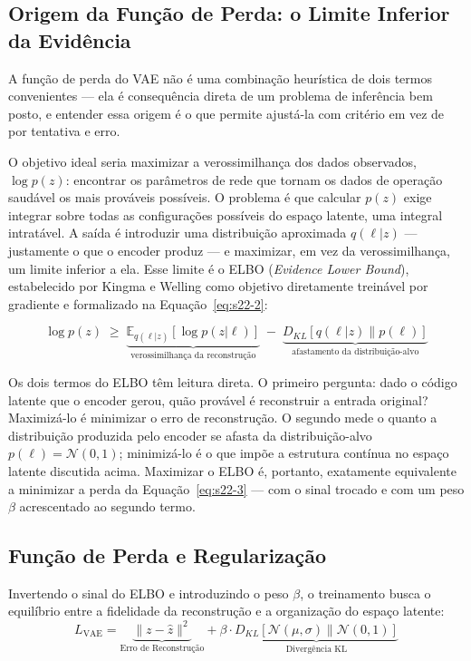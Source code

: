 \documentclass[12pt,a4paper]{article}
\numberwithin{equation}{section}
\numberwithin{table}{section}
\numberwithin{figure}{section}
\begin{document}
{	\subsection{Origem da Função de Perda: o Limite Inferior da Evidência}

	A função de perda do VAE não é uma combinação heurística de dois termos convenientes — ela é consequência direta de um problema de inferência bem posto, e entender essa origem é o que permite ajustá-la com critério em vez de por tentativa e erro.

	O objetivo ideal seria maximizar a verossimilhança dos dados observados, $\log p(z)$: encontrar os parâmetros de rede que tornam os dados de operação saudável os mais prováveis possíveis. O problema é que calcular $p(z)$ exige integrar sobre todas as configurações possíveis do espaço latente, uma integral intratável. A saída é introduzir uma distribuição aproximada $q(\ell|z)$ — justamente o que o encoder produz — e maximizar, em vez da verossimilhança, um limite inferior a ela. Esse limite é o ELBO (\textit{Evidence Lower Bound}), estabelecido por Kingma e Welling como objetivo diretamente treinável por gradiente \cite{vae} e formalizado na Equação~\eqref{eq:s22-2}:

	\begin{equation}\label{eq:s22-2}
	\log p(z) \;\ge\; \underbrace{\mathbb{E}_{q(\ell|z)}\left[ \log p(z|\ell) \right]}_{\text{verossimilhança da reconstrução}} \;-\; \underbrace{D_{KL}\left[ q(\ell|z) \parallel p(\ell) \right]}_{\text{afastamento da distribuição-alvo}}
\end{equation}

	Os dois termos do ELBO têm leitura direta. O primeiro pergunta: dado o código latente que o encoder gerou, quão provável é reconstruir a entrada original? Maximizá-lo é minimizar o erro de reconstrução. O segundo mede o quanto a distribuição produzida pelo encoder se afasta da distribuição-alvo $p(\ell) = \mathcal{N}(0,1)$; minimizá-lo é o que impõe a estrutura contínua no espaço latente discutida acima. Maximizar o ELBO é, portanto, exatamente equivalente a minimizar a perda da Equação~\eqref{eq:s22-3} — com o sinal trocado e com um peso $\beta$ acrescentado ao segundo termo.

	\subsection{Função de Perda e Regularização}
	Invertendo o sinal do ELBO e introduzindo o peso $\beta$, o treinamento busca o equilíbrio entre a fidelidade da reconstrução e a organização do espaço latente:
	\begin{equation}\label{eq:s22-3}
	L_{\text{VAE}} = \underbrace{\| z - \hat{z} \|^2}_{\text{Erro de Reconstrução}} + \beta \cdotp \underbrace{D_{KL} [ \mathcal{N}(\mu, \sigma) \parallel \mathcal{N}(0, 1) ]}_{\text{Divergência KL}}
\end{equation}

}
\end{document}
